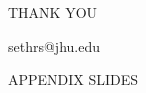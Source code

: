 \documentclass[slides, aspectratio=169]{beamer}
\begin{document}
\begin{frame}%
\begin{center}

\LARGE \color{spiritblue} THANK YOU
\bigskip

\large sethrs@jhu.edu

\end{center}
\end{frame}




\begin{frame}[noframenumbering]
\begin{center}
\LARGE
\color{heritageblue}
APPENDIX SLIDES
\end{center}
\end{frame}

\end{document}
